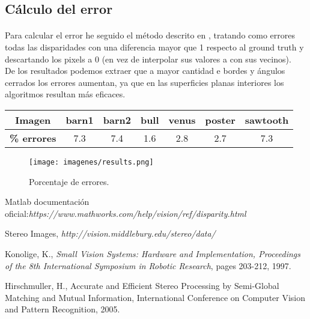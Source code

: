 \documentclass[es,gi]{ifirak}\usepackage[]{graphicx}\usepackage[]{color}
\begin{document}
\pagebreak
\subsection{Cálculo del error}
\paragraph{} Para calcular el error he seguido el método descrito en \cite{ket-4}, tratando como errores todas las disparidades con una diferencia mayor que 1 respecto al ground truth y descartando los pixels a 0 (en vez de interpolar sus valores a con sus vecinos).\\

De los resultados podemos extraer que a mayor cantidad e bordes y ángulos cerrados los errores aumentan, ya que en las superficies planas interiores los algoritmos resultan más eficaces.\\

\begin{table}[hbtp]
\centering
\begin{tabular}{ccccccc}
\toprule
\bfseries Imagen & barn1 &  barn2 &     bull & venus &  poster &  sawtooth\\
\midrule
\bfseries \% errores &  7.3 &    7.4 &   1.6  &   2.8 &    2.7 &    7.3 \\
\bottomrule
\end{tabular}
\end{table}

\begin{figure}[hbtp]
\centering
\texttt{[image: imagenes/results.png]}
\caption{Porcentaje de errores.}
\end{figure}

\begin{thebibliography}{arauak}
	
	 Matlab documentación oficial:\textit{https://www.mathworks.com/help/vision/ref/disparity.html}
	
	 Stereo Images, \textit{http://vision.middlebury.edu/stereo/data/}
	
	 Konolige, K., \textit{Small Vision Systems: Hardware and Implementation, Proceedings of the 8th International Symposium in Robotic Research}, pages 203-212, 1997.

 Hirschmuller, H., Accurate and Efficient Stereo Processing by Semi-Global Matching and Mutual Information, International Conference on Computer Vision and Pattern Recognition, 2005.

\end{thebibliography}
\end{document}
